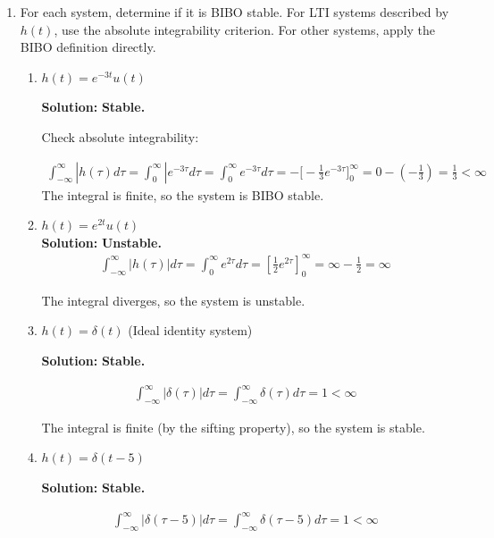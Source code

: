 \documentclass[nohyper,nobib,xcolor=dvipsnames,svgnames,x11names]{tufte-book}
\newenvironment{multiequation}{%
  \setlength{\abovedisplayskip}{3pt}      %
  \setlength{\belowdisplayskip}{6pt}      %
  \setlength{\abovedisplayshortskip}{3pt} %
  \setlength{\belowdisplayshortskip}{6pt} %
  \begin{equation}%
    \begin{aligned}%
}{%
    \end{aligned}%
  \end{equation}%
}
\begin{document}
\begin{enumerate}
\begin{enumerate}
\end{enumerate}


\item For each system, determine if it is BIBO stable. For LTI systems described by $ h(t) $, use the absolute integrability criterion. For other systems, apply the BIBO definition directly.

\begin{enumerate}


\item $ h(t) = e^{-3t} u(t) $

\textbf{Solution:} \textbf{Stable.} 

Check absolute integrability:

\begin{multiequation}
\int_{-\infty}^\infty |h(\tau) d\tau = \int_{0}^\infty | e^{-3\tau}d\tau = \int_{0}^\infty e^{-3\tau}d\tau = -\bigg[ -\frac{1}{3}e^{-3\tau} \bigg]_0^\infty = 0 - (-\frac{1}{3}) = \frac{1}{3} < \infty
\end{multiequation}
The integral is finite, so the system is BIBO stable.

\item $ h(t) = e^{2t} u(t) $ \\
\textbf{Solution:} \textbf{Unstable.} \\

\begin{multiequation}
\int_{-\infty}^{\infty} |h(\tau)|  d\tau = \int_{0}^{\infty} e^{2\tau}  d\tau = \left[ \frac{1}{2}e^{2\tau} \right]_{0}^{\infty} = \infty - \frac{1}{2} = \infty
\end{multiequation}

The integral diverges, so the system is unstable.

\item $ h(t) = \delta(t) $ (Ideal identity system)

\textbf{Solution:} \textbf{Stable.} 

\begin{multiequation}
\int_{-\infty}^{\infty} |\delta(\tau)|  d\tau = \int_{-\infty}^{\infty} \delta(\tau)  d\tau = 1 < \infty
\end{multiequation}

The integral is finite (by the sifting property), so the system is stable.

\item  $ h(t) = \delta(t - 5) $

\textbf{Solution:} \textbf{Stable.} 

\begin{multiequation}
\int_{-\infty}^{\infty} |\delta(\tau - 5)|  d\tau = \int_{-\infty}^{\infty} \delta(\tau - 5)  d\tau = 1 < \infty
\end{multiequation}


\end{enumerate}
\end{enumerate}
\end{document}
